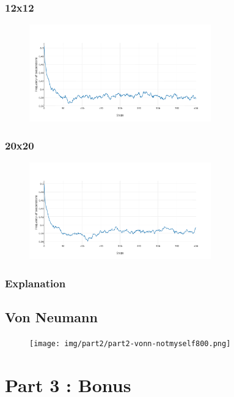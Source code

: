 \documentclass[11pt]{article}
\begin{document}
\subsubsection{12x12}

\begin{figure}[H]
\centering
   \includegraphics[width=0.7\textwidth]{img/part2/part2-moore-12-12.png}
\end{figure}

\subsubsection{20x20}

\begin{figure}[H]
\centering
   \includegraphics[width=0.7\textwidth]{img/part2/part2-moore-20-20.png}
\end{figure}

\subsubsection{Explanation}


\subsection{Von Neumann}

\begin{figure}[H]
\centering
   \texttt{[image: img/part2/part2-vonn-notmyself800.png]}
\end{figure}


\section{Part 3 : Bonus}
\end{document}

